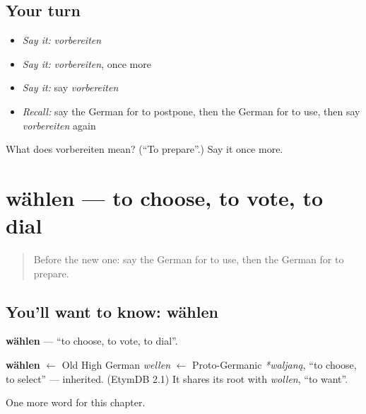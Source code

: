 \subsection*{Your turn}
\begin{itemize}
\raggedright
  \item \emph{Say it:} \emph{vorbereiten}
  \item \emph{Say it:} \emph{vorbereiten}, once more
  \item \emph{Say it:} say \emph{vorbereiten}
  \item \emph{Recall:} say the German for to postpone, then the German for to use, then say \emph{vorbereiten} again
\end{itemize}

\begin{tcolorbox}[breakable,colback=teal!4,colframe=teal!35!black,title={Before you move on}]
What does vorbereiten mean? (\textquotedblleft{}To prepare\textquotedblright{}.) Say it once more.
\end{tcolorbox}
\section[wählen]{wählen — to choose, to vote, to dial}

\label{lesson:GE-C191-waehlen}



\begin{quote}
Before the new one: say the German for to use, then the German for to prepare.
\end{quote}

\subsection*{You'll want to know: wählen}
\textbf{wählen} — \textquotedblleft{}to choose, to vote, to dial\textquotedblright{}.

\begin{cousinweb}
\textbf{wählen} $\leftarrow$ Old High German \emph{wellen} $\leftarrow$ Proto-Germanic \emph{*waljaną}, \textquotedblleft{}to choose, to select\textquotedblright{} — inherited. (EtymDB 2.1) It shares its root with \emph{wollen}, \textquotedblleft{}to want\textquotedblright{}.
\end{cousinweb}

\begin{grammarlens}[title={What you've built}]
One more word for this chapter.
\end{grammarlens}

